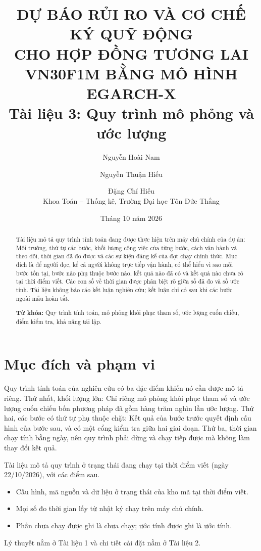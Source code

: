 \documentclass[12pt,a4paper]{article}
\title{\textbf{DỰ BÁO RỦI RO VÀ CƠ CHẾ KÝ QUỸ ĐỘNG\\ CHO HỢP ĐỒNG TƯƠNG LAI VN30F1M BẰNG MÔ HÌNH EGARCH-X}\\[8pt]
\large Tài liệu 3: Quy trình mô phỏng và ước lượng}
\author{Nguyễn Hoài Nam \and Nguyễn Thuận Hiếu \and Đặng Chí Hiếu\\[4pt]
\small Khoa Toán -- Thống kê, Trường Đại học Tôn Đức Thắng}
\date{Tháng 10 năm 2026}
\theoremstyle{remark}
\begin{document}
\maketitle
\thispagestyle{empty}

\begin{abstract}
\noindent Tài liệu mô tả quy trình tính toán đang được thực hiện trên máy chủ chính của dự án: Môi trường, thứ tự các bước, khối lượng công việc của từng bước, cách vận hành và theo dõi, thời gian đã đo được và các sự kiện đáng kể của đợt chạy chính thức. Mục đích là để người đọc, kể cả người không trực tiếp vận hành, có thể hiểu vì sao mỗi bước tồn tại, bước nào phụ thuộc bước nào, kết quả nào đã có và kết quả nào chưa có tại thời điểm viết. Các con số về thời gian được phân biệt rõ giữa số đã đo và số ước tính. Tài liệu không báo cáo kết luận nghiên cứu; kết luận chỉ có sau khi các bước ngoài mẫu hoàn tất.

\medskip
\noindent\textbf{Từ khóa:} Quy trình tính toán, mô phỏng khôi phục tham số, ước lượng cuốn chiếu, điểm kiểm tra, khả năng tái lập.
\end{abstract}

\newpage
\tableofcontents
\newpage

\section{Mục đích và phạm vi}

Quy trình tính toán của nghiên cứu có ba đặc điểm khiến nó cần được mô tả riêng. Thứ nhất, khối lượng lớn: Chỉ riêng mô phỏng khôi phục tham số và ước lượng cuốn chiếu bốn phương pháp đã gồm hàng trăm nghìn lần ước lượng. Thứ hai, các bước có thứ tự phụ thuộc chặt: Kết quả của bước trước quyết định cấu hình của bước sau, và có một cổng kiểm tra giữa hai giai đoạn. Thứ ba, thời gian chạy tính bằng ngày, nên quy trình phải dừng và chạy tiếp được mà không làm thay đổi kết quả.

Tài liệu mô tả quy trình ở trạng thái đang chạy tại thời điểm viết (ngày 22/10/2026), với các điểm sau.
\begin{itemize}
\item Cấu hình, mã nguồn và dữ liệu ở trạng thái của kho mã tại thời điểm viết.
\item Mọi số đo thời gian lấy từ nhật ký chạy trên máy chủ chính.
\item Phần chưa chạy được ghi là chưa chạy; ước tính được ghi là ước tính.
\end{itemize}
Lý thuyết nằm ở Tài liệu 1 và chi tiết cài đặt nằm ở Tài liệu 2.
\end{document}
